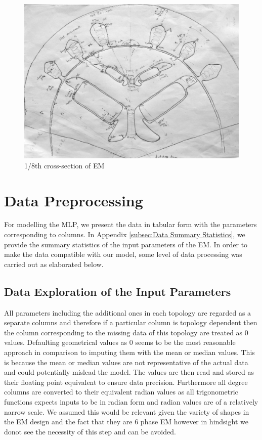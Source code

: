 \documentclass{report} %
\begin{document}
\begin{figure}[H]
    \centering
    \includegraphics[width=1\textwidth]{./ReportImages/EMCrosssectionFiltered.png} 
    \caption{1/8th cross-section of \ac{EM}}
    \label{fig:1/8 Motor Crossection}
\end{figure}

\section{Data Preprocessing}\label{sec:Data Preprocessing for MLP}
For modelling the \ac{MLP}, we present the data in tabular form with the parameters corresponding to columns. 
In Appendix \ref{subsec:Data Summary Statistics}, we provide the summary statistics of the input parameters of the \ac{EM}.
In order to make the data compatible with our model, some level of data processing was carried out as elaborated below.

\subsection{Data Exploration of the Input Parameters}\label{subsec:Deep Dive into Input Parameters}
All parameters including the additional ones in each topology are regarded as a separate columns and therefore if a particular column is topology dependent then the 
column corresponding to the missing data of this topology are treated as 0 values. Defaulting geometrical values as 0 seems to be the most reasonable approach in comparison 
to imputing them with the mean or median values. This is because the mean or median values are not representative of the actual data and could potentially mislead the model.
The values are then read and stored as their floating point equivalent to ensure data precision.
Furthermore all degree columns are converted to their equivalent radian values as all trigonometric functions expects inputs to be in radian form and radian values are of
a relatively narrow scale. 
We assumed this would be relevant given the variety of shapes in the \ac{EM} design and the fact that they are 6 phase \ac{EM} however in hindsight we donot see the 
necessity of this step and can be avoided.
\end{document}
